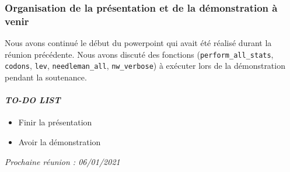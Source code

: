 \subsubsection*{Organisation de la présentation et de la démonstration à venir}
Nous avons continué le début du powerpoint qui avait été réalisé durant la réunion précédente. Nous avons discuté des fonctions (\texttt{perform\_all\_stats}, \texttt{codons}, \texttt{lev}, \texttt{needleman\_all}, \texttt{nw\_verbose}) à exécuter lors de la démonstration pendant la soutenance. 

\paragraph{\emph{TO-DO LIST}}
\begin{itemize}
    \item Finir la présentation
    \item Avoir la démonstration
\end{itemize}

\emph{Prochaine réunion : 06/01/2021}

% 